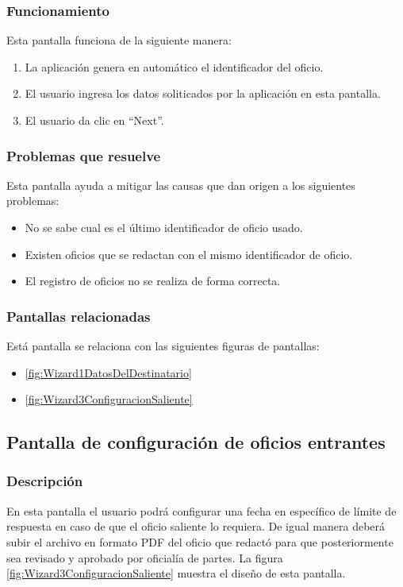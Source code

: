\subsubsection{Funcionamiento}
	Esta pantalla funciona de la siguiente manera:
	
	\begin{enumerate}
		\item La aplicación genera en automático el identificador del oficio.
		\item El usuario ingresa los datos soliticados por la aplicación en esta pantalla.
		\item El usuario da clic en ``Next''.
	\end{enumerate}

\subsubsection{Problemas que resuelve}
Esta pantalla ayuda a mitigar las causas que dan origen a los siguientes problemas:

	\begin{itemize}
		\item No se sabe cual es el último identificador de oficio usado.
		\item Existen oficios que se redactan con el mismo identificador de oficio.
		\item El registro de oficios no se realiza de forma correcta.
	\end{itemize}

\subsubsection{Pantallas relacionadas}
Está pantalla se relaciona con las siguientes figuras de pantallas:
	\begin{itemize}
		\item \ref{fig:Wizard1DatosDelDestinatario}
		\item \ref{fig:Wizard3ConfiguracionSaliente}
	\end{itemize}

\subsection{Pantalla de configuración de oficios entrantes}
\subsubsection{Descripción}
	En esta pantalla el usuario podrá configurar una fecha en específico de límite de respuesta en caso de que el oficio saliente lo requiera. De igual manera deberá subir el archivo en formato PDF del oficio que redactó para que posteriormente sea revisado y aprobado por oficialía de partes. La figura \ref{fig:Wizard3ConfiguracionSaliente} muestra el diseño de esta pantalla.		
		
